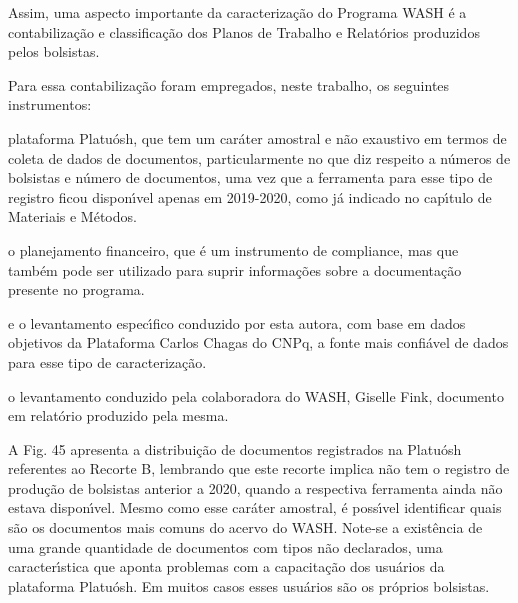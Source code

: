 \documentclass[
12pt,		%
openright,	%
twoside,  %
a4paper,			%
chapter=TITLE,		%
english,			%
french,				%
spanish,			%
brazil				%
]{USPSC-classe/USPSC}
\begin{document}
Assim, uma aspecto importante da caracteriza\c{c}\~ao do Programa WASH \'e a contabiliza\c{c}\~ao e classifica\c{c}\~ao dos Planos de Trabalho e Relat\'orios produzidos pelos bolsistas.








Para essa contabiliza\c{c}\~ao foram empregados, neste trabalho, os seguintes instrumentos:









\begin{alineas}
\item plataforma Platu\'osh, que tem um car\'ater amostral e n\~ao exaustivo em termos de coleta de dados de documentos, particularmente no que diz respeito a n\'umeros de bolsistas e n\'umero de documentos, uma vez que a ferramenta para esse tipo de registro ficou dispon\'{\i}vel apenas em 2019-2020, como j\'a indicado no cap\'{\i}tulo de Materiais e M\'etodos.
\item o planejamento financeiro, que \'e um instrumento de compliance, mas que tamb\'em pode ser utilizado para suprir informa\c{c}\~oes sobre a documenta\c{c}\~ao presente no programa.
\item e o levantamento espec\'{\i}fico conduzido por esta autora, com base em dados objetivos da Plataforma Carlos Chagas do CNPq, a fonte mais confi\'avel de dados para esse tipo de caracteriza\c{c}\~ao.
\item o levantamento conduzido pela colaboradora do WASH, Giselle Fink, documento em relat\'orio produzido pela mesma.
\end{alineas}

A Fig. 45 apresenta a distribui\c{c}\~ao de documentos registrados na Platu\'osh referentes ao Recorte B, lembrando que este recorte implica n\~ao tem o registro de produ\c{c}\~ao de bolsistas anterior a 2020, quando a respectiva ferramenta ainda n\~ao estava dispon\'{\i}vel. Mesmo como esse car\'ater amostral, \'e poss\'{\i}vel identificar quais s\~ao os documentos mais comuns do acervo do WASH. Note-se a exist\^encia de uma grande quantidade de documentos com tipos n\~ao declarados, uma caracter\'{\i}stica que aponta problemas com a capacita\c{c}\~ao dos usu\'arios da plataforma Platu\'osh. Em muitos casos esses usu\'arios s\~ao os pr\'oprios bolsistas.
\end{document}
